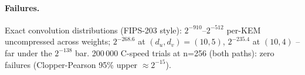 \paragraph{Failures.} Exact convolution distributions (FIPS-203 style):
$2^{-910}$--$2^{-512}$ per-KEM uncompressed across weights;
$2^{-268.6}$ at $(d_u,d_v)=(10,5)$, $2^{-235.4}$ at $(10,4)$ -- far under
the $2^{-138}$ bar. 200\,000 C-speed trials at n=256 (both paths): zero
failures (Clopper-Pearson 95\% upper $\approx 2^{-15}$).
